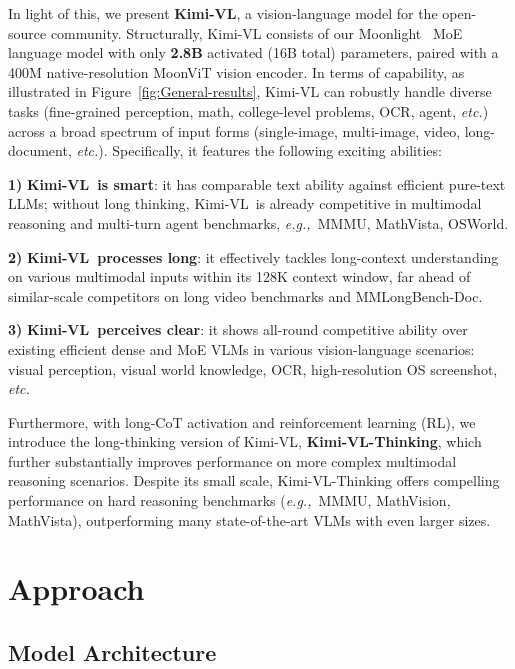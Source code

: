 \documentclass{article}
\newcommand{\ourname}{{Kimi-VL}}
\newcommand{\ourreasoningname}{{\ourname-Thinking}}
\newcommand{\citep}[1]{\parencite{#1}}
\begin{document}
In light of this, we present \textbf{\ourname}, a vision-language model for the open-source community. Structurally, \ourname{} consists of our Moonlight~\citep{liu2025muonscalablellmtraining} MoE language model with only \textbf{2.8B} activated (16B total) parameters, paired with a 400M native-resolution MoonViT vision encoder. In terms of capability, as illustrated in Figure~\ref{fig:General-results}, \ourname{} can robustly handle diverse tasks (fine-grained perception, math, college-level problems, OCR, agent, \textit{etc.}) across a broad spectrum of input forms (single-image, multi-image, video, long-document, \textit{etc.}). Specifically, it features the following exciting abilities:

%
\textbf{1)} \textbf{\ourname~is smart}: it has comparable text ability against efficient pure-text LLMs; without long thinking, \ourname~is already competitive in multimodal reasoning and multi-turn agent benchmarks, \textit{e.g.,~}MMMU, MathVista, OSWorld.

%
\textbf{2)} \textbf{\ourname~processes long}: it effectively tackles long-context understanding on various multimodal inputs within its 128K context window, far ahead of similar-scale competitors on long video benchmarks and MMLongBench-Doc.

%
\textbf{3)} \textbf{\ourname~perceives clear}: it shows all-round competitive ability over existing efficient dense and MoE VLMs in various vision-language scenarios: visual perception, visual world knowledge, OCR, high-resolution OS screenshot, \textit{etc.}


Furthermore, with long-CoT activation and reinforcement learning (RL), we introduce the long-thinking version of \ourname, \textbf{\ourreasoningname}, which further substantially improves performance on more complex multimodal reasoning scenarios. Despite its small scale, \ourreasoningname{} offers compelling performance on hard reasoning benchmarks (\textit{e.g.,~}MMMU, MathVision, MathVista), outperforming many state-of-the-art VLMs with even larger sizes.


\section{Approach}



\subsection{Model Architecture}
\end{document}
